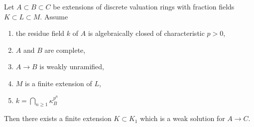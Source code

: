 \begin{lemma}
\label{lemma-special-case}
Let $A \subset B \subset C$ be extensions of discrete valuation rings
with fraction fields $K \subset L \subset M$. Assume
\begin{enumerate}
\item the residue field $k$ of $A$ is algebraically closed of
characteristic $p > 0$,
\item $A$ and $B$ are complete,
\item $A \to B$ is weakly unramified,
\item $M$ is a finite extension of $L$,
\item $k = \bigcap\nolimits_{n \geq 1} \kappa_B^{p^n}$
\end{enumerate}
Then there exists a finite extension $K \subset K_1$ which
is a weak solution for $A \to C$.
\end{lemma}


